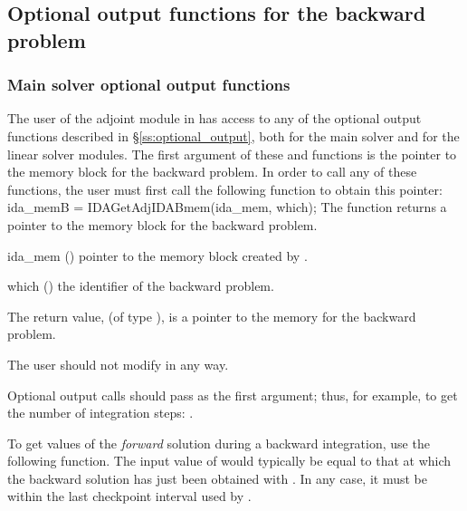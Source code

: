 
\subsection{Optional output functions for the backward problem}
\label{ss:optional_output_b}

\subsubsection{Main solver optional output functions}

The user of the adjoint module in {\idas} has access to any of the
optional output functions described in \S\ref{ss:optional_output},
both for the main solver and for the linear solver modules. The first
argument of these  and  functions is the
pointer to the {\idas} memory block for the backward problem. In order
to call any of these functions, the user must first call the following
function to obtain this pointer:
{
  ida\_memB = IDAGetAdjIDABmem(ida\_mem, which);
}
{
  The function  returns a pointer to the {\idas}
  memory block for the backward problem.
}
{
  \begin{args}
  \item[ida\_mem] ()
    pointer to the {\idas} memory block created by .
  \item[which] ()
    the identifier of the backward problem.
  \end{args}
}
{
  The return value,  (of type ), is a pointer to the
  {\idas} memory for the backward problem.
}
{
  {\warn}The user should not modify  in any way.

  Optional output calls should pass  as the first argument;
  thus, for example, to get the number of integration steps:
  .
}


To get values of the {\it forward} solution during a backward integration,
use the following function.  The input value of  would typically be
equal to that at which the backward solution has just been obtained with
.  In any case, it must be within the last checkpoint interval
used by .

